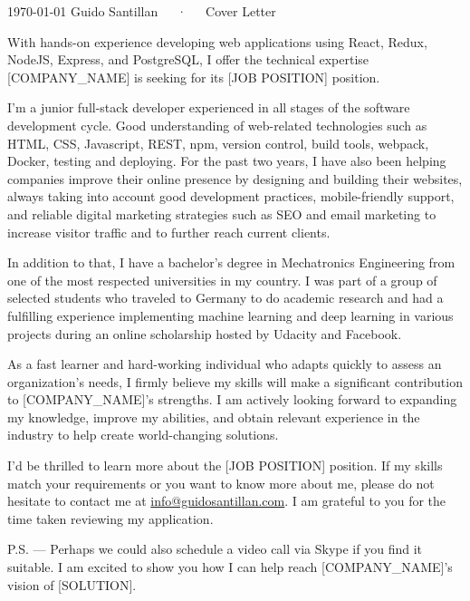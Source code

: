 \documentclass[11pt, a4paper]{awesome-cv}
\begin{document}
\makecvheader[C]

\makecvfooter
  {\today}
  {Guido Santillan~~~·~~~Cover Letter}
  {}

\makelettertitle

\begin{cvletter}

With hands-on experience developing web applications using React, Redux, NodeJS, Express, and PostgreSQL, I offer the technical expertise [COMPANY_NAME] is seeking for its [JOB POSITION] position.

I'm a junior full-stack developer experienced in all stages of the software development cycle. Good understanding of web-related technologies such as HTML, CSS, Javascript, REST, npm, version control, build tools, webpack, Docker, testing and deploying. For the past two years, I have also been helping companies improve their online presence by designing and building their websites, always taking into account good development practices, mobile-friendly support, and reliable digital marketing strategies such as SEO and email marketing to increase visitor traffic and to further reach current clients.

In addition to that, I have a bachelor's degree in Mechatronics Engineering from one of the most respected universities in my country. I was part of a group of selected students who traveled to Germany to do academic research and had a fulfilling experience implementing machine learning and deep learning in various projects during an online scholarship hosted by Udacity and Facebook.

As a fast learner and hard-working individual who adapts quickly to assess an organization's needs, I firmly believe my skills will make a significant contribution to [COMPANY_NAME]'s strengths. I am actively looking forward to expanding my knowledge, improve my abilities, and obtain relevant experience in the industry to help create world-changing solutions.

I'd be thrilled to learn more about the [JOB POSITION] position. If my skills match your requirements or you want to know more about me, please do not hesitate to contact me at \href{mailto:info@guidosantillan.com}{info@guidosantillan.com}. I am grateful to you for the time taken reviewing my application.

\end{cvletter}

\makeletterclosing

P.S. — Perhaps we could also schedule a video call via Skype if you find it suitable. I am excited to show you how I can help reach [COMPANY_NAME]'s vision of [SOLUTION].
\end{document}
